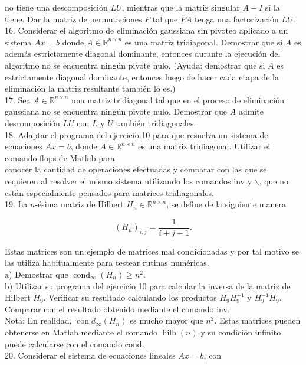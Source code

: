 \documentclass[10pt]{article}
\begin{document}
no tiene una descomposición $L U$, mientras que la matriz singular $A-I$ sí la tiene. Dar la matriz de permutaciones $P$ tal que $P A$ tenga una factorización $L U$.\\
16. Considerar el algoritmo de eliminación gaussiana sin pivoteo aplicado a un sistema $A x=b$ donde $A \in \mathbb{R}^{n \times n}$ es una matriz tridiagonal. Demostrar que si $A$ es además estrictamente diagonal dominante, entonces durante la ejecución del algoritmo no se encuentra ningún pivote nulo. (Ayuda: demostrar que si $A$ es estrictamente diagonal dominante, entonces luego de hacer cada etapa de la eliminación la matriz resultante también lo es.)\\
17. Sea $A \in \mathbb{R}^{n \times n}$ una matriz tridiagonal tal que en el proceso de eliminación gaussiana no se encuentra ningún pivote nulo. Demostrar que $A$ admite descomposición $L U$ con $L$ y $U$ también tridiagonales.\\
18. Adaptar el programa del ejercicio 10 para que resuelva un sistema de ecuaciones $A x=b$, donde $A \in \mathbb{R}^{n \times n}$ es una matriz tridiagonal. Utilizar el comando flops de Matlab para\\
conocer la cantidad de operaciones efectuadas y comparar con las que se requieren al resolver el mismo sistema utilizando los comandos inv y $\backslash$, que no están especialmente pensados para matrices tridiagonales.\\
19. La $n$-ésima matriz de Hilbert $H_{n} \in \mathbb{R}^{n \times n}$, se define de la siguiente manera

$$
\left(H_{n}\right)_{i, j}=\frac{1}{i+j-1} .
$$

Estas matrices son un ejemplo de matrices mal condicionadas y por tal motivo se las utiliza habitualmente para testear rutinas numéricas.\\
a) Demostrar que $\operatorname{cond}_{\infty}\left(H_{n}\right) \geq n^{2}$.\\
b) Utilizar su programa del ejercicio 10 para calcular la inversa de la matriz de Hilbert $H_{9}$. Verificar su resultado calculando los productos $H_{9} H_{9}^{-1}$ y $H_{9}^{-1} H_{9}$. Comparar con el resultado obtenido mediante el comando inv.\\
Nota: En realidad, $\operatorname{con} d_{\infty}\left(H_{n}\right)$ es mucho mayor que $n^{2}$. Estas matrices pueden obtenerse en Matlab mediante el comando $\operatorname{hilb}(n)$ y su condición infinito puede calcularse con el comando cond.\\
20. Considerar el sistema de ecuaciones lineales $A x=b$, con
\end{document}
